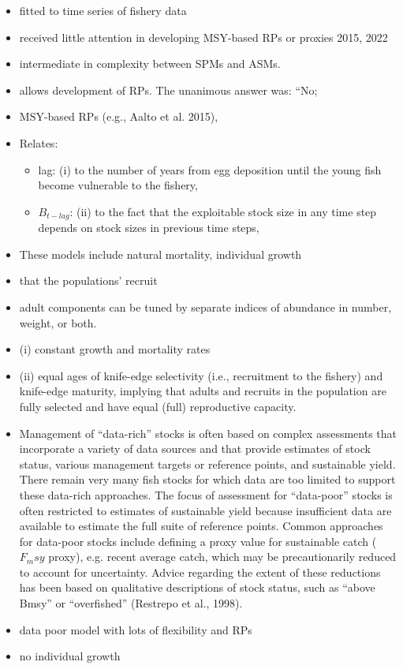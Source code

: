 \begin{itemize}
\item fitted to time series of fishery data
\item received little attention in developing MSY-based RPs or proxies 2015, 2022
\item intermediate in complexity between SPMs and ASMs.
\item allows development of RPs. The unanimous answer was: “No;
\item MSY-based RPs (e.g., Aalto et al. 2015),
\item Relates:
\begin{itemize}
	\item lag: (i) to the number of years from egg deposition until the young fish become vulnerable to the fishery,
	\item $B_{t-lag}$: (ii) to the fact that the exploitable stock size in any time step depends on stock sizes in previous time steps,
\end{itemize}
\item These models include natural mortality, individual growth
\item that the populations’ recruit 
\item adult components can be tuned by separate indices of abundance in number, weight, or both.
\item (i) constant growth and mortality rates
\item (ii) equal ages of knife-edge selectivity (i.e., recruitment to the fishery) and knife-edge maturity, implying that adults and recruits in the population are fully selected and have equal (full) reproductive capacity.
\end{itemize}

\begin{itemize}
\item 
Management of “data-rich” stocks is often based on complex assessments that incorporate a variety of data sources and that provide estimates of stock status, various management targets or reference points, and sustainable yield. 
There remain very many fish stocks for which data are too limited to support these data-rich approaches. 
The focus of assessment for “data-poor” stocks is often restricted to estimates of sustainable yield because insufficient data are available to estimate the full suite of reference points. 
Common approaches for data-poor stocks include defining a proxy value for sustainable catch ($F_msy$ proxy), e.g. recent average catch, which may be precautionarily reduced to account for uncertainty. 
Advice regarding the extent of these reductions has been based on qualitative descriptions of stock status, such as “above Bmsy” or “overfished” (Restrepo et al., 1998).
\item data poor model with lots of flexibility and RPs
\item no individual growth
\end{itemize}

